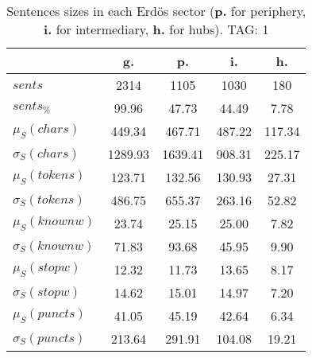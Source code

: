 \begin{table}[h!]
\begin{center}
\begin{tabular}{| l | c | c | c | c |}\hline
 & g. & p. & i. & h. \\\hline
$sents$ & 2314  & 1105  & 1030  & 180 \\\hline
$sents_{\%}$ & 99.96  & 47.73  & 44.49  & 7.78 \\\hline
$\mu_S(chars)$ & 449.34  & 467.71  & 487.22  & 117.34 \\\hline
$\sigma_S(chars)$ & 1289.93  & 1639.41  & 908.31  & 225.17 \\\hline
$\mu_S(tokens)$ & 123.71  & 132.56  & 130.93  & 27.31 \\\hline
$\sigma_S(tokens)$ & 486.75  & 655.37  & 263.16  & 52.82 \\\hline
$\mu_S(knownw)$ & 23.74  & 25.15  & 25.00  & 7.82 \\\hline
$\sigma_S(knownw)$ & 71.83  & 93.68  & 45.95  & 9.90 \\\hline
$\mu_S(stopw)$ & 12.32  & 11.73  & 13.65  & 8.17 \\\hline
$\sigma_S(stopw)$ & 14.62  & 15.01  & 14.97  & 7.20 \\\hline
$\mu_S(puncts)$ & 41.05  & 45.19  & 42.64  & 6.34 \\\hline
$\sigma_S(puncts)$ & 213.64  & 291.91  & 104.08  & 19.21 \\\hline
\end{tabular}
\caption{Sentences sizes in each Erd\"os sector ({{\bf p.}} for periphery, {{\bf i.}} for intermediary, {{\bf h.}} for hubs). TAG: 1}
\end{center}
\end{table}